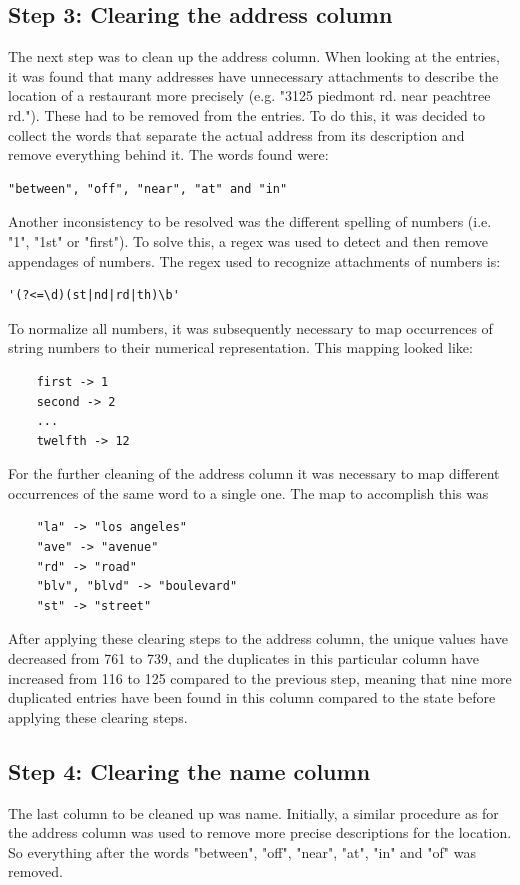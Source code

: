 \documentclass[conference]{IEEEtran}
\begin{document}
\subsection{Step 3: Clearing the address column}
The next step was to clean up the address column. When looking at the entries, it was found that many addresses have unnecessary attachments to describe the location of a restaurant more precisely (e.g. "3125 piedmont rd. near peachtree rd."). These had to be removed from the entries. To do this, it was decided to collect the words that separate the actual address from its description and remove everything behind it. The words found were: 
\begin{lstlisting}
"between", "off", "near", "at" and "in"
\end{lstlisting}
Another inconsistency to be resolved was the different spelling of numbers (i.e. "1", "1st" or "first"). To solve this, a regex was used to detect and then remove appendages of numbers. The regex used to recognize attachments of numbers is: 
\begin{lstlisting}
'(?<=\d)(st|nd|rd|th)\b'
\end{lstlisting}
To normalize all numbers, it was subsequently necessary to map occurrences of string numbers to their numerical representation. This mapping looked like: 
\begin{lstlisting}
	first -> 1
	second -> 2
	...
	twelfth -> 12
\end{lstlisting} 
For the further cleaning of the address column it was necessary to map different occurrences of the same word to a single one. The map to accomplish this was 
\begin{lstlisting}
	"la" -> "los angeles" 
	"ave" -> "avenue"
	"rd" -> "road"
	"blv", "blvd" -> "boulevard" 
	"st" -> "street"
\end{lstlisting} 
After applying these clearing steps to the address column, the unique values have decreased from 761 to 739, and the duplicates in this particular column have increased from 116 to 125 compared to the previous step, meaning that nine more duplicated entries have been found in this column compared to the state before applying these clearing steps.
\subsection{Step 4: Clearing the name column}
The last column to be cleaned up was name. Initially, a similar procedure as for the address column was used to remove more precise descriptions for the location. So everything after the words "between", "off", "near", "at", "in" and "of" was removed.
\end{document}
